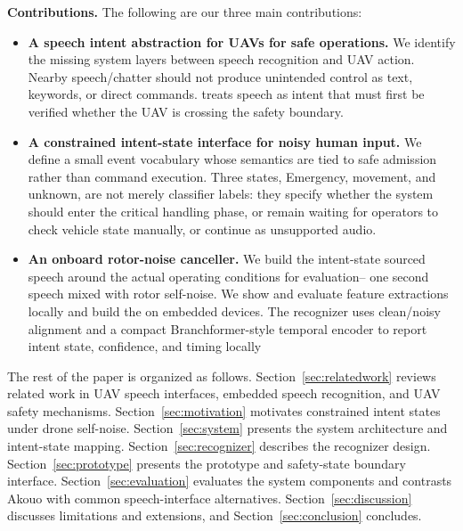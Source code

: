 
\textbf{Contributions.} The following are our three main contributions:
\begin{itemize}
\item \textbf{A speech intent abstraction for UAVs for safe operations.} We identify the missing system layers between speech recognition and UAV action. Nearby speech/chatter should not produce unintended control as text, keywords, or direct commands. \sys{} treats speech as intent that must first be verified whether the UAV is crossing the safety boundary.
\item \textbf{A constrained intent-state interface for noisy human input.} We define a small event vocabulary whose semantics are tied to safe admission rather than command execution. Three states, Emergency, movement, and unknown, are not merely classifier labels: they specify whether the system should enter the critical handling phase, or remain waiting for operators to check vehicle state manually, or continue as unsupported audio.
\item \textbf{An onboard rotor-noise canceller.} We build the intent-state sourced speech around the actual operating conditions for evaluation-- one second speech mixed with rotor self-noise. We show and evaluate feature extractions locally and build the \sys{} on embedded devices. The recognizer uses clean/noisy alignment and a compact Branchformer-style temporal encoder to report intent state, confidence, and timing locally
\end{itemize}

The rest of the paper is organized as follows. Section~\ref{sec:relatedwork} reviews related work in UAV speech interfaces, embedded speech recognition, and UAV safety mechanisms. Section~\ref{sec:motivation} motivates constrained intent states under drone self-noise. Section~\ref{sec:system} presents the system architecture and intent-state mapping. Section~\ref{sec:recognizer} describes the recognizer design. Section~\ref{sec:prototype} presents the prototype and safety-state boundary interface. Section~\ref{sec:evaluation} evaluates the system components and contrasts Akouo with common speech-interface alternatives. Section~\ref{sec:discussion} discusses limitations and extensions, and Section~\ref{sec:conclusion} concludes.

